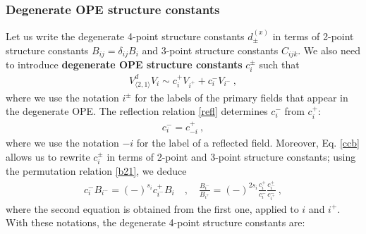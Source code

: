 \documentclass[12pt, a4paper]{article}
\theoremstyle{break}
\begin{document}
\subsubsection{Degenerate OPE structure constants}

Let us write the degenerate 4-point structure constants $d^{(x)}_\pm$ in terms of 2-point structure constants $B_{ij}=\delta_{ij}B_i$ and 3-point structure constants $C_{ijk}$. We also need to introduce \textbf{degenerate OPE structure constants} $c_i^\pm$ such that 
\begin{align}
V_{\langle 2,1\rangle}^d V_i \sim c^+_i V_{i^+} + c^-_i V_{i^-}\ ,
\end{align}
where we use the notation $i^\pm$ for the labels of the primary fields that appear in the degenerate OPE. 
The reflection relation \eqref{refl} determines $c_i^-$ from $c_i^+$:
\begin{align}
 c_i^- = c^+_{-i}\ ,
 \label{cim}
\end{align}
where we use the notation $-i$ for the label of a reflected field. 
Moreover,
Eq. \eqref{ccb} allows us to rewrite $c_i^\pm$ in terms of 2-point and 3-point structure constants; using the permutation relation \eqref{b21}, we deduce 
\begin{align}
 c_i^- B_{i^-} = (-)^{s_i} c^+_{i^-} B_i\quad , \quad \frac{B_{i^-}}{B_{i^+}} =(-)^{2s_i} \frac{c_i^+}{c_i^-}\frac{c_{i^-}^+}{c_{i^+}^-}\ ,
 \label{cbcb}
\end{align}
where the second equation is obtained from the first one, applied to $i$ and $i^+$. 
With these notations, the degenerate 4-point structure constants are:
\end{document}

